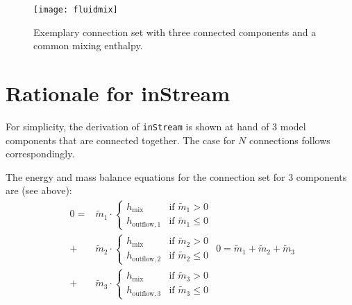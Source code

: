 \begin{figure}[H]
  \begin{center}
    \texttt{[image: fluidmix]}
  \end{center}
  \caption{
    Exemplary connection set with three connected components and a common mixing enthalpy.
  }
\end{figure}

\section{Rationale for inStream}\label{rationale-for-the-formulation-of-the-instream-operator}\label{rationale-for-instream}

For simplicity, the derivation of \lstinline!inStream! is shown at hand of 3 model components that are connected together.
The case for $N$ connections follows correspondingly.

The energy and mass balance equations for the connection set for 3 components are (see above):
\begin{subequations}
\label{eq:D1}
\begin{equation}
\begin{split}
0=&\tilde{m}_1\cdot
\begin{cases}
h_{\mathrm{mix}}&\text{if $\tilde{m}_1>0$}\\
h_{\mathrm{outflow},1}&\text{if $\tilde{m}_1 \leq 0$}
\end{cases}\\
+&\tilde{m}_2\cdot
\begin{cases}
h_{\mathrm{mix}}&\text{if $\tilde{m}_2>0$}\\
h_{\mathrm{outflow},2}&\text{if $\tilde{m}_2 \leq 0$}
\end{cases}\\
+&\tilde{m}_3\cdot
\begin{cases}
h_{\mathrm{mix}}&\text{if $\tilde{m}_3>0$}\\
h_{\mathrm{outflow},3}&\text{if $\tilde{m}_3 \leq 0$}
\end{cases}
\end{split}
\label{eq:D1a}
\end{equation}
\begin{equation}
0=\tilde{m}_1+\tilde{m}_2+\tilde{m}_3
\label{eq:D1b}
\end{equation}
\end{subequations}


